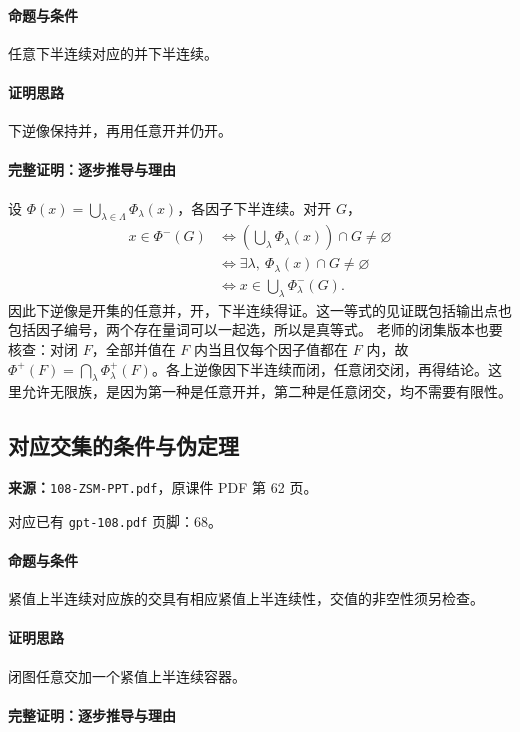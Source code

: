 \paragraph{命题与条件}任意下半连续对应的并下半连续。
\paragraph{证明思路}下逆像保持并，再用任意开并仍开。
\paragraph{完整证明：逐步推导与理由}

设 $\Phi(x)=\bigcup_{\lambda\in\Lambda}\Phi_\lambda(x)$，各因子下半连续。对开 $G$，
\begin{align*}
x\in\Phi^-(G)&\iff\left(\bigcup_\lambda\Phi_\lambda(x)\right)\cap G\ne\varnothing\\
&\iff\exists\lambda,\ \Phi_\lambda(x)\cap G\ne\varnothing\\
&\iff x\in\bigcup_\lambda\Phi_\lambda^-(G).
\end{align*}
因此下逆像是开集的任意并，开，下半连续得证。这一等式的见证既包括输出点也包括因子编号，两个存在量词可以一起选，所以是真等式。
老师的闭集版本也要核查：对闭 $F$，全部并值在 $F$ 内当且仅每个因子值都在 $F$ 内，故 $\Phi^+(F)=\bigcap_\lambda\Phi_\lambda^+(F)$。各上逆像因下半连续而闭，任意闭交闭，再得结论。这里允许无限族，是因为第一种是任意开并，第二种是任意闭交，均不需要有限性。

\clearpage\subsection{对应交集的条件与伪定理}
\textbf{来源：}\texttt{108-ZSM-PPT.pdf}，原课件 PDF 第 62 页。\par
对应已有 \texttt{gpt-108.pdf} 页脚：68。\par
\paragraph{命题与条件}紧值上半连续对应族的交具有相应紧值上半连续性，交值的非空性须另检查。
\paragraph{证明思路}闭图任意交加一个紧值上半连续容器。
\paragraph{完整证明：逐步推导与理由}

